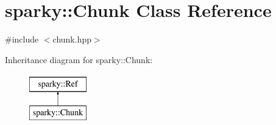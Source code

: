 \hypertarget{classsparky_1_1_chunk}{}\section{sparky\+:\+:Chunk Class Reference}
\label{classsparky_1_1_chunk}


{\ttfamily \#include $<$chunk.\+hpp$>$}

Inheritance diagram for sparky\+:\+:Chunk\+:\begin{figure}[H]
\begin{center}
\leavevmode
\includegraphics[height=2.000000cm]{classsparky_1_1_chunk}
\end{center}
\end{figure}
